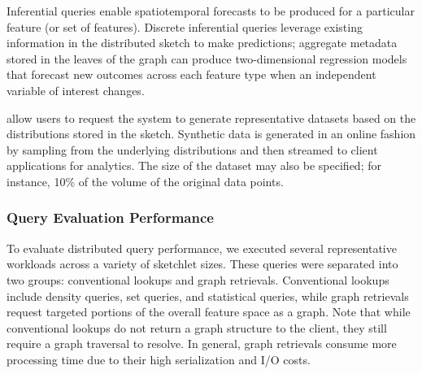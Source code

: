\begin{description}[leftmargin=*]

\item[Inferential Queries]
    Inferential queries enable spatiotemporal forecasts to be produced for a particular feature (or set of features). Discrete inferential queries leverage existing information in the distributed sketch to make predictions; aggregate metadata stored in the leaves of the graph can produce two-dimensional regression models that forecast new outcomes across each feature type when an independent variable of interest changes.


\item[Synthetic Data Queries] allow users to request the system to generate representative datasets based on the distributions stored in the sketch. Synthetic data is generated in an online fashion by sampling from the underlying distributions and then streamed to client applications for analytics. The size of the dataset may also be specified; for instance, 10\% of the volume of the original data points.
\end{description}

\subsubsection{Query Evaluation Performance}
To evaluate distributed query performance, we executed several representative workloads across a variety of sketchlet sizes. These queries were separated into two groups: conventional lookups and graph retrievals. Conventional lookups include density queries, set queries, and statistical queries, while graph retrievals request targeted portions of the overall feature space as a graph.  Note that while conventional lookups do not return a graph structure to the client, they still require a graph traversal to resolve. In general, graph retrievals consume more processing time due to their high serialization and I/O costs.

